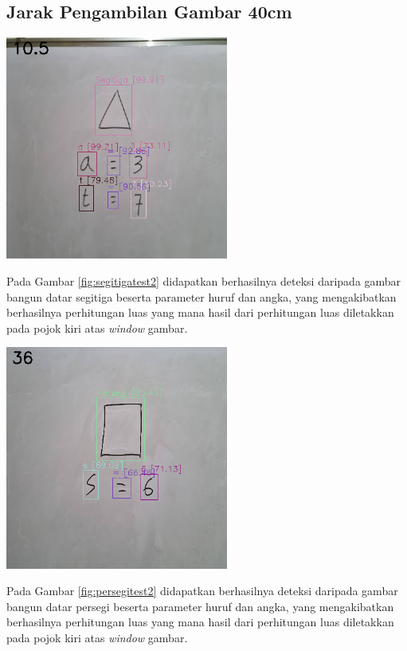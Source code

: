 \subsection{Jarak Pengambilan Gambar 40cm}
\begin{center}
	\includegraphics[width=0.55\textwidth]{gambar/segitiga2.png}
	\label{fig:segitigatest2}
\end{center}
Pada Gambar \ref{fig:segitigatest2} didapatkan berhasilnya deteksi daripada gambar bangun datar segitiga beserta parameter huruf dan angka, yang mengakibatkan berhasilnya perhitungan luas yang mana hasil dari perhitungan luas diletakkan pada pojok kiri atas \textit{window} gambar.

\begin{center}
	\includegraphics[width=0.55\textwidth]{gambar/persegi2.png}
	\label{fig:persegitest2}
\end{center}
Pada Gambar \ref{fig:persegitest2} didapatkan berhasilnya deteksi daripada gambar bangun datar persegi beserta parameter huruf dan angka, yang mengakibatkan berhasilnya perhitungan luas yang mana hasil dari perhitungan luas diletakkan pada pojok kiri atas \textit{window} gambar.

